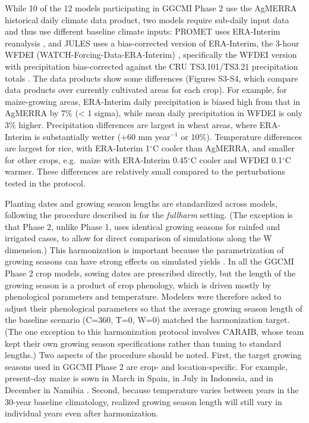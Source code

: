 \documentclass[gmd, manuscript]{copernicus} %
\begin{document}
While 10 of the 12 models participating in GGCMI Phase 2 use the AgMERRA historical daily climate data product, two models require sub-daily input data and thus use different baseline climate inputs:
PROMET uses ERA-Interim reanalysis \citep{dee2011era}, and JULES uses a bias-corrected version of ERA-Interim, the 3-hour WFDEI (WATCH-Forcing-Data-ERA-Interim) \citep{weedon2014wfdei}, specifically the WFDEI version with precipitation bias-corrected against the CRU TS3.101/TS3.21 precipitation totals \citep{harris_cru_2014}.
The data products show some differences (Figures S3-S4, which compare data products over currently cultivated areas for each crop). 
For example, for maize-growing areas, ERA-Interim daily precipitation is biased high from that in AgMERRA by 7\% (< 1 sigma), while mean daily precipitation in WFDEI is only 3\% higher. 
Precipitation differences are largest in wheat areas, where ERA-Interim is substantially wetter (+60 mm year$^{-1}$ or 10\%). 
Temperature differences are largest for rice, with ERA-Interim 1$^\circ$C cooler than AgMERRA, and smaller for other crops, e.g.\ maize with ERA-Interim 0.45$^\circ$C cooler and WFDEI 0.1$^\circ$C warmer. 
These differences are relatively small compared to the perturbations tested in the protocol.

Planting dates and growing season lengths are standardized across models, following the procedure described in \citet{Elliott2015} for the \textit{fullharm} setting. 
(The exception is that Phase 2, unlike Phase 1, uses identical growing seasons for rainfed and irrigated cases, to allow for direct comparison of simulations along the W dimension.) %
This harmonization is important because the parametrization of growing seasons can have strong effects on simulated yields \citep{muller_global_2017, Jag2018}.
In all the GGCMI Phase 2 crop models, sowing dates are prescribed directly, but the length of the growing season is a product of crop phenology, which is driven mostly by phenological parameters and temperature. 
Modelers were therefore asked to adjust their phenological parameters so that the average growing season length of the baseline scenario (C=360, T=0, W=0) matched the harmonization target. 
(The one exception to this harmonization protocol involves CARAIB, whose team kept their own growing season specifications rather than tuning to standard lengths.)
Two aspects of the procedure should be noted. First, the target growing seasons used in GGCMI Phase 2 are crop- and location-specific.
For example, present-day maize is sown in March in Spain, in July in Indonesia, and in December in Namibia \citep{Portmann2010}.
Second, because temperature varies between years in the 30-year baseline climatology, realized growing season length will still vary in individual years even after harmonization. 
\end{document}
